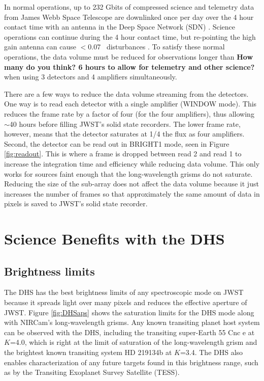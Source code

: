 \documentclass[iop]{emulateapj}
\begin{document}
In normal operations, up to 232 Gbits of compressed science and telemetry data from James Webb Space Telescope are downlinked once per day over the 4 hour contact time with an antenna in the Deep Space Network (SDN)  \citep{dashevsky2008groundflight}.
Science operations can continue during the 4 hour contact time, but re-pointing the high gain antenna can cause $<$0.07 \arcsec\ disturbances \citep{beichman2014pasp}.
To satisfy these normal operations, the data volume must be reduced for observations longer than \textbf{How many do you think? 6 hours to allow for telemetry and other science?} when using 3 detectors and 4 amplifiers simultaneously.

There are a few ways to reduce the data volume streaming from the detectors.
One way is to read each detector with a single amplifier (WINDOW mode).
This reduces the frame rate by a factor of four (for the four amplifiers), thus allowing $\sim$40 hours before filling JWST's solid state recorders.
The lower frame rate, however, means that the detector saturates at 1/4 the flux as four amplifiers.
Second, the detector can be read out in BRIGHT1 mode, seen in Figure \ref{fig:readout}.
This is where a frame is dropped between read 2 and read 1 to increase the integration time and efficiency while reducing data volume.
This only works for sources faint enough that the long-wavelength grisms do not saturate.
Reducing the size of the sub-array does not affect the data volume because it just increases the number of frames so that approximately the same amount of data in pixels is saved to JWST's solid state recorder.

\section{Science Benefits with the DHS}\label{sec:addedScience}

\subsection{Brightness limits}\label{sec:brightness}

The DHS has the best brightness limits of any spectroscopic mode on JWST because it spreads light over many pixels and reduces the effective aperture of JWST.
Figure \ref{fig:DHSaps} shows the saturation limits for the DHS mode along with NIRCam's long-wavelength grisms.
Any known transiting planet host system can be observed with the DHS, including the transiting super-Earth  55 Cnc e \citep{mcarthur2004disc55cnce} at $K$=4.0, which is right at the limit of saturation of the long-wavelength grism and the brightest known transiting system HD 219134b \citep{motalebi2015hd219134b} at $K$=3.4.
The DHS also enables characterization of any future targets found in this brightness range, such as by the Transiting Exoplanet Survey Satellite (TESS).
\end{document}
